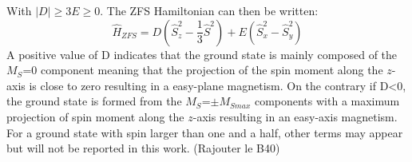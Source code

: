 \documentclass[10pt]{report}
\numberwithin{equation}{section}
\begin{document}
With $|D| \geq 3E \geq 0$. 
The ZFS Hamiltonian can then be written:
\begin{equation}  %
    \hat{H}_{ZFS}=D (\hat{S}_z^2-\frac{1}{3}\hat{S}^2)+E(\hat{S}_x^2-\hat{S}_y^2)
\end{equation}
A positive value of D indicates that the ground state is mainly composed of the $M_S$=0 component meaning that the projection of the spin moment along the $z$-axis is close to zero resulting in a easy-plane magnetism. 
On the contrary if D<0, the ground state is formed from the $M_S$=$\pm M_{Smax}$ components with a maximum projection of spin moment along the $z$-axis resulting in an easy-axis magnetism.
For a ground state with spin larger than one and a half, other terms may appear but will not be reported in this work. (Rajouter le B40)
\end{document}
